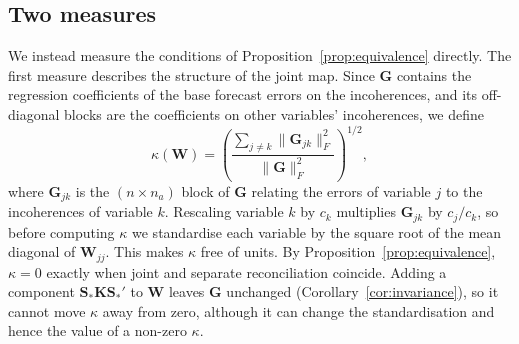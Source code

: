 \subsection{Two measures}

We instead measure the conditions of Proposition~\ref{prop:equivalence} directly. The first measure describes the structure of the joint map. Since $\bm{G}$ contains the regression coefficients of the base forecast errors on the incoherences, and its off-diagonal blocks are the coefficients on other variables' incoherences, we define
\begin{equation}\label{eq:kappa}
  \kappa(\bm{W}) = \left(\frac{\sum_{j \ne k}\|\bm{G}_{jk}\|_F^2}{\|\bm{G}\|_F^2}\right)^{1/2},
\end{equation}
where $\bm{G}_{jk}$ is the $(n \times n_a)$ block of $\bm{G}$ relating the errors of variable $j$ to the incoherences of variable $k$. Rescaling variable $k$ by $c_k$ multiplies $\bm{G}_{jk}$ by $c_j/c_k$, so before computing $\kappa$ we standardise each variable by the square root of the mean diagonal of $\bm{W}_{jj}$. This makes $\kappa$ free of units. By Proposition~\ref{prop:equivalence}, $\kappa = 0$ exactly when joint and separate reconciliation coincide. Adding a component $\bm{S}_*\bm{K}\bm{S}_*'$ to $\bm{W}$ leaves $\bm{G}$ unchanged (Corollary~\ref{cor:invariance}), so it cannot move $\kappa$ away from zero, although it can change the standardisation and hence the value of a non-zero $\kappa$.

